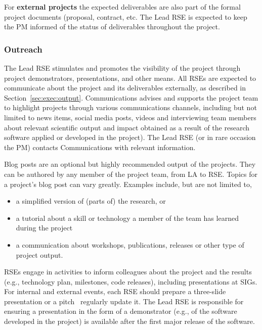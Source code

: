 For \textbf{external projects} the expected deliverables are also part of the formal project documents (proposal,
contract, etc. The Lead RSE is expected to keep the PM informed of the status of deliverables throughout the project.


\subsubsection{Outreach}
\label{sec:exec:outreach}
The Lead RSE stimulates and promotes the visibility of the project through project demonstrators, presentations, and
other means. All RSEs are expected to communicate about the project and its deliverables externally, as
described in Section~\ref{sec:exec:output}. Communications advises and supports the project team to
highlight projects through various communications channels, including but not limited to news items, social media
posts, videos and interviewing team members about relevant scientific output and impact obtained as a result of the
research software applied or developed in the project). The Lead RSE (or in rare occasion the PM) contacts
Communications with relevant information. 

Blog posts are an optional but highly recommended output of the projects. They can be authored by any member of the
project team, from LA to RSE. Topics for a project's blog post can vary greatly. Examples
include, but are not limited to,
\begin{itemize}
\item a simplified version of (parts of) the research, or 
\item a tutorial about a skill or technology a member of the team has learned during the project
\item a communication about workshops, publications, releases or other type of project output.
\end{itemize}

RSEs engage in activities to inform colleagues about the project and the results (e.g., technology plan, milestones,
code releases), including presentations at SIGs. For internal and external events, each RSE should prepare a
three-slide presentation or a pitch~\cite{proj-portfolio} 
regularly update it. The Lead RSE is responsible for ensuring a presentation in the form of a demonstrator (e.g., of the
software developed in the project) is available after the first major release of the software.



